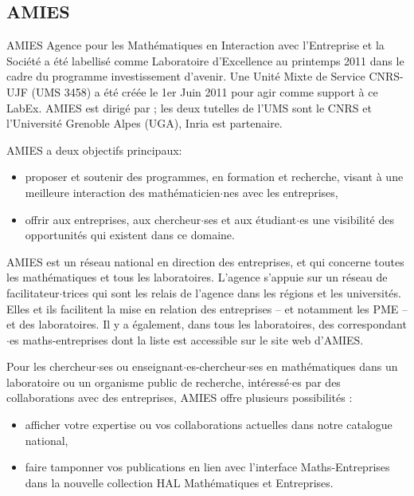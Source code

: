 \subsection{AMIES }
 \label{AMIES}

\noindent AMIES  \og{}Agence pour les Math\'ematiques en Interaction avec l'Entreprise
et la Soci\'et\'e\fg{} a \'et\'e labellis\'e comme Laboratoire d'Excellence au
printemps 2011 dans le cadre du programme investissement d'avenir. Une Unit\'e Mixte de
Service CNRS-UJF (UMS 3458) a \'et\'e cr\'e\'ee le 1er Juin 2011 pour agir
comme support \`a ce LabEx.  AMIES est dirig\'e par ;  
les deux tutelles de l'UMS sont le CNRS et l'Universit{\'e} Grenoble Alpes (UGA), Inria est partenaire.

AMIES a deux objectifs principaux:
\begin{itemize}
\item  proposer et soutenir des programmes, en formation et recherche,
  visant \`a une meilleure interaction des math\'ematicien$\cdot$nes avec les  entreprises, 
\item offrir aux entreprises, aux chercheur$\cdot$ses et aux \'etudiant$\cdot$es
  une visibilit\'e des opportunit\'es qui existent dans ce domaine. 
\end{itemize}

AMIES est un r\'eseau national en direction des entreprises, et qui concerne toutes les
math\'ematiques et tous les laboratoires.  
L'agence  s'appuie sur un r\'eseau  de facilitateur$\cdot$trices qui sont  les relais de l'agence dans les r\'egions et les universit\'es.
Elles et ils facilitent la mise en relation des entreprises -- et notamment les PME -- et des laboratoires.
Il y a \'egalement, dans tous les laboratoires, des correspondant$\cdot$es maths-entreprises dont la liste est
accessible sur le site web d'AMIES.

Pour les chercheur$\cdot$ses ou enseignant$\cdot$es-chercheur$\cdot$ses en math\'ematiques dans un laboratoire ou un organisme public de recherche,
int\'eress\'e$\cdot$es par des collaborations avec des entreprises,  AMIES offre plusieurs possibilit\'es : 
\begin{itemize}
\item  afficher votre expertise ou vos collaborations
  actuelles dans notre catalogue national,
\item   faire tamponner vos publications en lien avec
  l'interface Maths-Entreprises dans la nouvelle collection HAL
  \og{}Math\'ematiques et Entreprises\fg{}.
\end{itemize}

